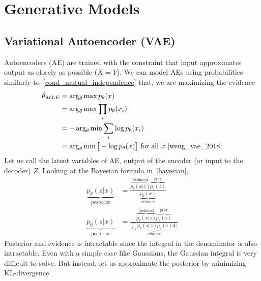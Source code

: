 \documentclass{book}
\numberwithin{equation}{subsection}
\begin{document}
\chapter{Generative Models}
\section{Variational Autoencoder (VAE)}
Autoencoders (AE) are trained with the constraint that input approximates output as closely as possible ($X=Y$). We can model AEs using probabilities similarly to~\ref{cond_mutual_independence} that, we are maximizing the evidence
\begin{align}
    \hat{\theta}_{MLE} &= \arg_\theta\max p_\theta(x)\\ 
    &= \arg_\theta\max\prod_i p_\theta(x_i)\\
    &= -\arg_\theta\min\sum_i \log p_\theta(x_i)\\
    &= \arg_\theta\min\big[-\log p_\theta(x)\big]\ \text{for all $x$}~\cite{weng_vae_2018}
\end{align}
Let us call the latent variables of AE, output of the encoder (or input to the decoder) $Z$. Looking at the Bayesian formula in~\ref{bayesian}, 
\begin{align}
    \underbrace{p_\theta(z|x)}_{\text{posterior}} &= \frac{\overbrace{p_\theta(x|z)}^\text{likelihood}\overbrace{p_\theta(z)}^\text{prior}}{\underbrace{p_\theta(x)}_\text{evidence}}\\
    \underbrace{p_\theta(z|x)}_{\text{posterior}} &= \frac{\overbrace{p_\theta(x|z)}^\text{likelihood}\overbrace{p_\theta(z)}^\text{prior}}{\underbrace{\int_z p_\theta(x|z)p_\theta(z)dz}_\text{evidence}}
\end{align}
Posterior and evidence is intractable since the integral in the denominator is also intractable. Even with a simple case like Gaussians, the Gaussian integral is very difficult to solve. But instead, let us approximate the posterior by minimizing KL-divergence
\end{document}
